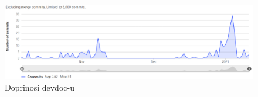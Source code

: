 		        \begin{figure}[H]
    			    \includegraphics[scale=0.65]{dijagrami/commits-to-devdoc.PNG}
    			    \centering
    			    \caption{Doprinosi devdoc-u}
    			    \label{fig:shema}
		        \end{figure}

